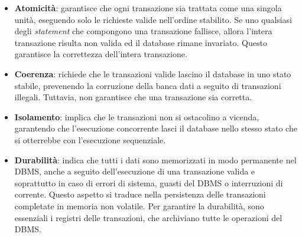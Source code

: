 \begin{itemize}
    \item \textbf{Atomicità}: garantisce che ogni transazione sia trattata come una singola unità, eseguendo solo le richieste valide nell’ordine stabilito. Se uno qualsiasi degli \textit{statement} che compongono una transazione fallisce, allora l’intera transazione risulta non valida ed il database rimane invariato. Questo garantisce la correttezza dell’intera transazione.\cite{DATABASE_universeit}
    \item \textbf{Coerenza}: richiede che le transazioni valide lascino il database in uno stato stabile, prevenendo la corruzione della banca dati a seguito di transazioni illegali. Tuttavia, non garantisce che una transazione sia corretta.\cite{DATABASE_universeit}
    \item \textbf{Isolamento}: implica che le transazioni non si ostacolino a vicenda, garantendo che l’esecuzione concorrente lasci il database nello stesso stato che si otterrebbe con l’esecuzione sequenziale.\cite{DATABASE_universeit}
    \item \textbf{Durabilità}: indica che tutti i dati sono memorizzati in modo permanente nel DBMS, anche a seguito dell’esecuzione di una transazione valida e soprattutto in caso di errori di sistema, guasti del DBMS o interruzioni di corrente. Questo aspetto si traduce nella persistenza delle transazioni completate in memoria non volatile. Per garantire la durabilità, sono essenziali i registri delle transazioni, che archiviano tutte le operazioni del DBMS.\cite{DATABASE_universeit}
\end{itemize}

